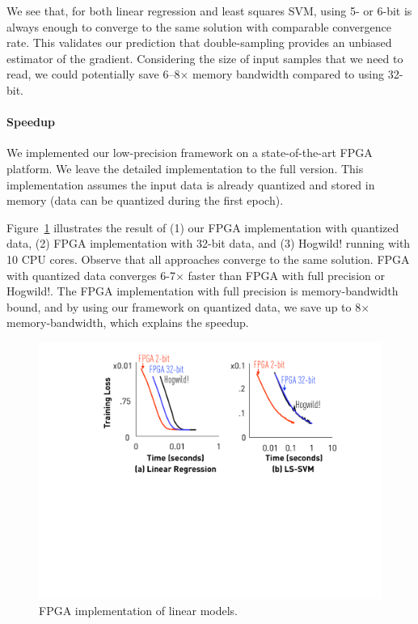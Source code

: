 \documentclass{article}
\begin{document}
We see that, for both linear regression 
and least squares SVM,
using 5- or 6-bit is always enough
to converge to the same solution
with comparable convergence rate. 
This validates our prediction that
double-sampling provides an
unbiased estimator of the gradient.
Considering the size of input
samples that we need to read, we
could potentially save 6--8$\times$ 
memory bandwidth compared to using 
32-bit. 

\paragraph{Speedup}
We implemented our low-precision 
framework on a state-of-the-art 
FPGA platform. We leave the detailed 
implementation to the full version.
This implementation assumes the input
data is already quantized and
stored in memory (data can be
quantized during the
first epoch).

Figure~\ref{fig:speedup} illustrates 
the result of (1) our FPGA
implementation with quantized data,
(2) FPGA implementation with 32-bit
data, and (3) Hogwild! running with
10 CPU cores. 
Observe that all approaches
converge to the same solution.
FPGA with quantized data converges
6-7$\times$ faster
than FPGA with full precision
or Hogwild!. The FPGA implementation
with full precision is
memory-bandwidth bound, and by using our framework on quantized data, we save 
up to 8$\times$ memory-bandwidth, which
explains the speedup.


\begin{figure}[t]
\centering
\includegraphics[width=0.8\columnwidth]{final-experiments/linear-fpga} 
\caption{FPGA implementation of linear models.}
\label{fig:speedup}
\end{figure}
\end{document}
